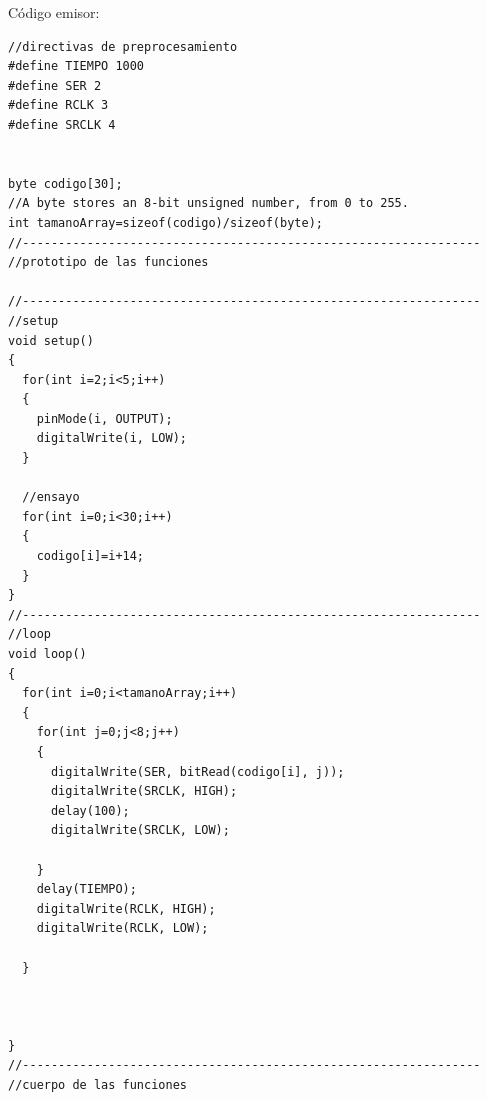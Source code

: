 \documentclass{article}
\begin{document}
Código emisor:
\begin{lstlisting}[style=myArduino]
//directivas de preprocesamiento
#define TIEMPO 1000
#define SER 2
#define RCLK 3
#define SRCLK 4


byte codigo[30];
//A byte stores an 8-bit unsigned number, from 0 to 255.
int tamanoArray=sizeof(codigo)/sizeof(byte);
//----------------------------------------------------------------
//prototipo de las funciones

//----------------------------------------------------------------
//setup
void setup()
{
  for(int i=2;i<5;i++)
  {
    pinMode(i, OUTPUT);
    digitalWrite(i, LOW);
  }
  
  //ensayo
  for(int i=0;i<30;i++)
  {
    codigo[i]=i+14;
  }
}
//----------------------------------------------------------------
//loop
void loop()
{
  for(int i=0;i<tamanoArray;i++)
  {
    for(int j=0;j<8;j++)
    {
      digitalWrite(SER, bitRead(codigo[i], j));
      digitalWrite(SRCLK, HIGH);
      delay(100);
      digitalWrite(SRCLK, LOW);

    }
    delay(TIEMPO);
    digitalWrite(RCLK, HIGH);
    digitalWrite(RCLK, LOW);
    
  }
  
  
  
}
//----------------------------------------------------------------
//cuerpo de las funciones
\end{lstlisting}
\end{document}
